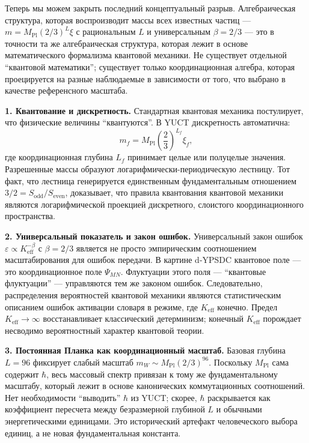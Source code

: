\documentclass[11pt,a4paper]{article}
\begin{document}
	Теперь мы можем закрыть последний концептуальный разрыв. Алгебраическая структура, которая воспроизводит массы всех известных частиц — \(m = M_{\mathrm{Pl}}(2/3)^L\xi\) с рациональным $L$ и универсальным $\beta=2/3$ — это в точности та же алгебраическая структура, которая лежит в основе математического формализма квантовой механики. Не существует отдельной ``квантовой математики''; существует только координационная алгебра, которая проецируется на разные наблюдаемые в зависимости от того, что выбрано в качестве референсного масштаба.
	
	\medskip
	\noindent\textbf{1. Квантование и дискретность.}
	Стандартная квантовая механика постулирует, что физические величины ``квантуются''. В YUCT дискретность автоматична:
	\[
	m_f = M_{\mathrm{Pl}} \left( \frac{2}{3} \right)^{L_f} \xi_f,
	\]
	где координационная глубина $L_f$ принимает целые или полуцелые значения. Разрешенные массы образуют логарифмически-периодическую лестницу. Тот факт, что лестница генерируется единственным фундаментальным отношением $3/2 = S_{\mathrm{odd}}/S_{\mathrm{even}}$, доказывает, что правила квантования квантовой механики являются логарифмической проекцией дискретного, слоистого координационного пространства.
	
	\medskip
	\noindent\textbf{2. Универсальный показатель и закон ошибок.}
	Универсальный закон ошибок $\varepsilon \propto K_{\mathrm{eff}}^{-\beta}$ с $\beta = 2/3$ является не просто эмпирическим соотношением масштабирования для ошибок передачи. В картине d‑YPSDC квантовое поле — это координационное поле $\Psi_{MN}$. Флуктуации этого поля — ``квантовые флуктуации'' — управляются тем же законом ошибок. Следовательно, распределения вероятностей квантовой механики являются статистическим описанием ошибок активации словаря в режиме, где $K_{\mathrm{eff}}$ конечно. Предел $K_{\mathrm{eff}}\to\infty$ восстанавливает классический детерминизм; конечный $K_{\mathrm{eff}}$ порождает несводимо вероятностный характер квантовой теории.
	
	\medskip
	\noindent\textbf{3. Постоянная Планка как координационный масштаб.}
	Базовая глубина $L=96$ фиксирует слабый масштаб $m_W \sim M_{\mathrm{Pl}}(2/3)^{96}$. Поскольку $M_{\mathrm{Pl}}$ сама содержит $\hbar$, весь массовый спектр привязан к тому же фундаментальному масштабу, который лежит в основе канонических коммутационных соотношений. Нет необходимости ``выводить'' $\hbar$ из YUCT; скорее, $\hbar$ раскрывается как коэффициент пересчета между безразмерной глубиной $L$ и обычными энергетическими единицами. Это исторический артефакт человеческого выбора единиц, а не новая фундаментальная константа.
	
\end{document}
